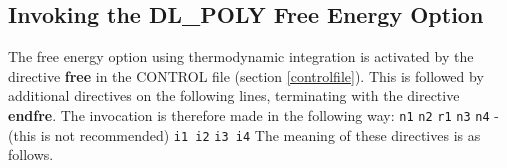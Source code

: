 \subsection{Invoking the DL\_POLY Free Energy Option}

The free energy option using thermodynamic integration is activated by the
directive {\bf free} in the CONTROL file (section \ref{controlfile}). This is
followed by additional directives on the following lines, terminating with
the directive {\bf endfre}. The invocation is therefore made in the following
way:\newline \newline
{} \newline
{} {\tt n1} \newline
{} {\tt n2} \newline
{} {\tt r1} \newline
{} {\tt n3} \newline
{} {\tt n4} \newline
{} - (this is not recommended)\newline
{} {\tt i1 i2} \newline
{} {\tt i3 i4} \newline
{}\newline
\newline
The meaning of these directives is as follows.
